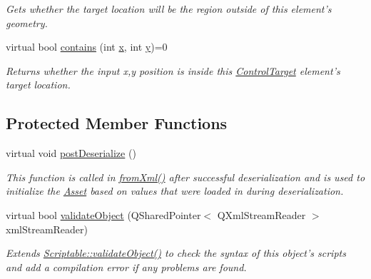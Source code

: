 \begin{DoxyCompactItemize}
\begin{DoxyCompactList}\small\item\em Gets whether the target location will be the region outside of this element's geometry. \end{DoxyCompactList}\item 
\hypertarget{class_picto_1_1_control_target_aeba5d02793b4d40933e793cde3971940}{virtual bool \hyperlink{class_picto_1_1_control_target_aeba5d02793b4d40933e793cde3971940}{contains} (int \hyperlink{struct_picto_1_1_visual_element_a1b50bc5fa41868f661687015be3c97e8}{x}, int \hyperlink{struct_picto_1_1_visual_element_a9a4db3430219e1f78208eda1a89e9f38}{y})=0}\label{class_picto_1_1_control_target_aeba5d02793b4d40933e793cde3971940}

\begin{DoxyCompactList}\small\item\em Returns whether the input x,y position is inside this \hyperlink{class_picto_1_1_control_target}{Control\-Target} element's target location. \end{DoxyCompactList}\end{DoxyCompactItemize}
\subsection*{Protected Member Functions}
\begin{DoxyCompactItemize}
\item 
virtual void \hyperlink{class_picto_1_1_control_target_a0cd5e40f668903b31db033efdf31829b}{post\-Deserialize} ()
\begin{DoxyCompactList}\small\item\em This function is called in \hyperlink{class_picto_1_1_asset_a8bed4da09ecb1c07ce0dab313a9aba67}{from\-Xml()} after successful deserialization and is used to initialize the \hyperlink{class_picto_1_1_asset}{Asset} based on values that were loaded in during deserialization. \end{DoxyCompactList}\item 
\hypertarget{class_picto_1_1_control_target_a708c1e33dd901e2295116e9881dd981e}{virtual bool \hyperlink{class_picto_1_1_control_target_a708c1e33dd901e2295116e9881dd981e}{validate\-Object} (Q\-Shared\-Pointer$<$ Q\-Xml\-Stream\-Reader $>$ xml\-Stream\-Reader)}\label{class_picto_1_1_control_target_a708c1e33dd901e2295116e9881dd981e}

\begin{DoxyCompactList}\small\item\em Extends \hyperlink{class_picto_1_1_scriptable_ab6e2944c43a3b5d418bf7b251594386d}{Scriptable\-::validate\-Object()} to check the syntax of this object's scripts and add a compilation error if any problems are found. \end{DoxyCompactList}\end{DoxyCompactItemize}
